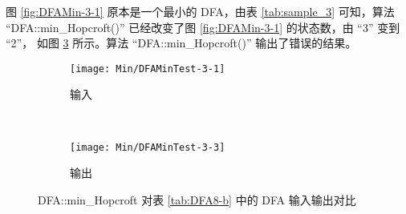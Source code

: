 图 \ref{fig:DFAMin-3-1} 原本是一个最小的 DFA，由表 \ref{tab:sample_3} 可知，算法 “DFA::min\_Hopcroft()” 已经改变了图 \ref{fig:DFAMin-3-1} 的状态数，由 “3” 变到 “2”， 如图 \ref{fig:DFAMinHoop-3} 所示。算法 “DFA::min\_Hopcroft()” 输出了错误的结果。

\begin{figure}[!htbp]
    \centering
    \begin{subfigure}[b]{0.4\textwidth}
        \texttt{[image: Min/DFAMinTest-3-1]}
        \caption{输入}
        \label{fig:DFAMin-3-1-inside}
    \end{subfigure}
    ~
    \begin{subfigure}[b]{0.4\textwidth}
        \texttt{[image: Min/DFAMinTest-3-3]}
        \caption{输出}
        \label{fig:DFAMin-3-3-inside}
    \end{subfigure}
    \caption{DFA::min\_Hopcroft 对表 \ref{tab:DFA8-b} 中的 DFA 输入输出对比}
    \label{fig:DFAMinHoop-3}
  \end{figure}




